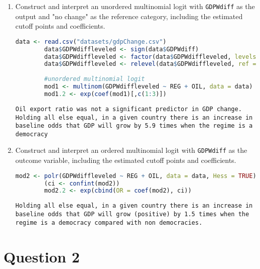 \documentclass[12pt,letterpaper]{article}
\begin{document}
\begin{enumerate}
	\item Construct and interpret an unordered multinomial logit with \texttt{GDPWdiff} as the output and "no change" as the reference category, including the estimated cutoff points and coefficients.
	
	\begin{lstlisting}[language=R]
		data <- read.csv("datasets/gdpChange.csv")
		data$GDPWdiffleveled <- sign(data$GDPWdiff)
		data$GDPWdiffleveled <- factor(data$GDPWdiffleveled, levels = c("-1", "0", "1"), labels = c("negative", "no change", "positive"))
		data$GDPWdiffleveled <- relevel(data$GDPWdiffleveled, ref = "no change")
		
		#unordered multinomial logit
		mod1 <- multinom(GDPWdiffleveled ~ REG + OIL, data = data)
		mod1.2 <- exp(coef(mod1)[,c(1:3)])\end{lstlisting}
	
	
	\texttt{Oil export ratio was not a significant predictor in GDP change. Holding all else equal, in a given country there is an increase in baseline odds that GDP will grow by 5.9 times when the regime is a democracy}
	
	\item Construct and interpret an ordered multinomial logit with \texttt{GDPWdiff} as the outcome variable, including the estimated cutoff points and coefficients.
	\begin{lstlisting}[language=R]
		mod2 <- polr(GDPWdiffleveled ~ REG + OIL, data = data, Hess = TRUE)
		(ci <- confint(mod2))
		mod2.2 <- exp(cbind(OR = coef(mod2), ci))\end{lstlisting}
	
	
	\texttt{Holding all else equal, in a given country there is an increase in baseline odds that GDP will grow (positive) by 1.5 times when the regime is a democracy compared with non democracies.}
\end{enumerate}

\newpage
\section*{Question 2} 
\vspace{.25cm}
\end{document}
